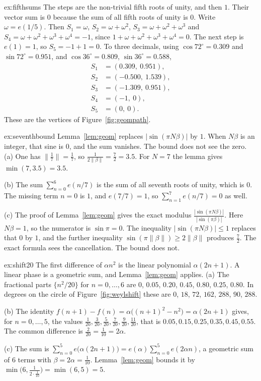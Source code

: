 \begin{solution}{ex:fifthsums}
\idea The steps are the non-trivial fifth roots of unity, and then $1$. Their vector sum is $0$ because the sum of all fifth roots of unity is $0$.
\writeup Write $\omega=e(1/5)$. Then $S_1=\omega$, $S_2=\omega+\omega^2$, $S_3=\omega+\omega^2+\omega^3$ and $S_4=\omega+\omega^2+\omega^3+\omega^4=-1$, since $1+\omega+\omega^2+\omega^3+\omega^4=0$. The next step is $e(1)=1$, so $S_5=-1+1=0$. To three decimals, using $\cos72^\circ=0.309$ and $\sin72^\circ=0.951$, and $\cos36^\circ=0.809$, $\sin36^\circ=0.588$,
\[
\begin{aligned}
S_1&=(0.309,\ 0.951),\\
S_2&=(-0.500,\ 1.539),\\
S_3&=(-1.309,\ 0.951),\\
S_4&=(-1,\ 0),\\
S_5&=(0,\ 0).
\end{aligned}
\]
These are the vertices of Figure~\ref{fig:geompath}.
\end{solution}

\begin{solution}{ex:seventhbound}
\idea Lemma~\ref{lem:geom} replaces $|\sin(\pi N\beta)|$ by $1$. When $N\beta$ is an integer, that sine is $0$, and the sum vanishes. The bound does not see the zero.
\writeup (a) One has $\bigl\|\frac17\bigr\|=\frac17$, so $\frac1{2\|\beta\|}=\frac72=3.5$. For $N=7$ the lemma gives $\min(7,3.5)=3.5$.

(b) The sum $\sum_{n=0}^{6}e(n/7)$ is the sum of all seventh roots of unity, which is $0$. The missing term $n=0$ is $1$, and $e(7/7)=1$, so $\sum_{n=1}^7 e(n/7)=0$ as well.

(c) The proof of Lemma~\ref{lem:geom} gives the exact modulus $\frac{|\sin(\pi N\beta)|}{|\sin(\pi\beta)|}$. Here $N\beta=1$, so the numerator is $\sin\pi=0$. The inequality $|\sin(\pi N\beta)|\le1$ replaces that $0$ by $1$, and the further inequality $\sin(\pi\|\beta\|)\ge2\|\beta\|$ produces $\frac72$. The exact formula sees the cancellation. The bound does not.
\end{solution}

\begin{solution}{ex:shift20}
\idea The first difference of $\alpha n^2$ is the linear polynomial $\alpha(2n+1)$. A linear phase is a geometric sum, and Lemma~\ref{lem:geom} applies.
\writeup (a) The fractional parts $\{n^2/20\}$ for $n=0,\dots,6$ are $0$, $0.05$, $0.20$, $0.45$, $0.80$, $0.25$, $0.80$. In degrees on the circle of Figure~\ref{fig:weylshift} these are $0$, $18$, $72$, $162$, $288$, $90$, $288$.

(b) The identity $f(n+1)-f(n)=\alpha\bigl((n+1)^2-n^2\bigr)=\alpha(2n+1)$ gives, for $n=0,\dots,5$, the values $\frac1{20},\frac3{20},\frac5{20},\frac7{20},\frac9{20},\frac{11}{20}$, that is $0.05,0.15,0.25,0.35,0.45,0.55$. The common difference is $\frac{2}{20}=\frac1{10}=2\alpha$.

(c) The sum is $\sum_{n=0}^{5}e\bigl(\alpha(2n+1)\bigr)=e(\alpha)\sum_{n=0}^{5}e(2\alpha n)$, a geometric sum of $6$ terms with $\beta=2\alpha=\frac1{10}$. Lemma~\ref{lem:geom} bounds it by $\min\bigl(6,\frac1{2\cdot\frac1{10}}\bigr)=\min(6,5)=5$.
\end{solution}

